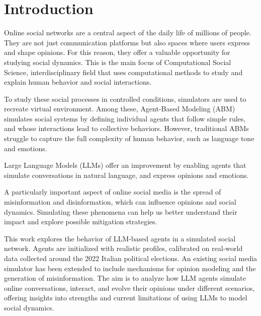 \section{Introduction}
\label{sec:introduction}

Online social networks are a central aspect of the daily life of millions of people. They are not just communication platforms but also spaces where users express and shape opinions.
For this reason, they offer a valuable opportunity for studying social dynamics.
This is the main focus of Computational Social Science, interdisciplinary field that uses computational methods to study and explain human behavior and social interactions.

To study these social processes in controlled conditions, simulators are used to recreate virtual environment.
Among these, Agent-Based Modeling (ABM) simulates social systems by defining individual agents that follow simple rules, and whose interactions lead to collective behaviors.
However, traditional ABMs struggle to capture the full complexity of human behavior, such as language tone and emotions.

Large Language Models (LLMs) offer an improvement by enabling agents that simulate conversations in natural language, and express opinions and emotions.

A particularly important aspect of online social media is the spread of misinformation and disinformation, which can influence opinions and social dynamics. 
Simulating these phenomena can help us better understand their impact and explore possible mitigation strategies.

This work explores the behavior of LLM-based agents in a simulated social network. 
Agents are initialized with realistic profiles, calibrated on real-world data collected around the 2022 Italian political elections. An existing social media simulator has been extended to include mechanisms for opinion modeling and the generation of misinformation. 
The aim is to analyze how LLM agents simulate online conversations, interact, and evolve their opinions under different scenarios, offering insights into strengths and current limitations of using LLMs to model social dynamics.

